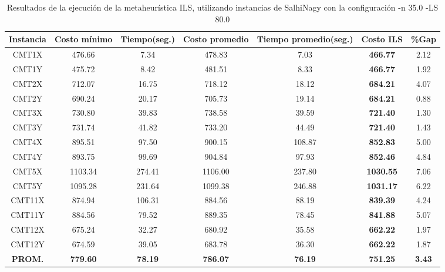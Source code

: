 \begin{table}[ht]
\caption{Resultados de la ejecución de la metaheurística ILS, utilizando instancias de SalhiNagy con la configuración -n 35.0 -LS 80.0}
\centering
\small
\begin{tabular}{c c c c c c c}
\hline\hline
Instancia & Costo mínimo & Tiempo(seg.) & Costo promedio & Tiempo promedio(seg.) & Costo ILS & \%Gap \\ [0.5ex]
\hline
CMT1X & 476.66 & 7.34 & 
478.83 & 7.03 & \bf{466.77} & 
2.12\\CMT1Y & 475.72 & 8.42 & 
481.51 & 8.33 & \bf{466.77} & 
1.92\\CMT2X & 712.07 & 16.75 & 
718.12 & 18.12 & \bf{684.21} & 
4.07\\CMT2Y & 690.24 & 20.17 & 
705.73 & 19.14 & \bf{684.21} & 
0.88\\CMT3X & 730.80 & 39.83 & 
738.58 & 39.59 & \bf{721.40} & 
1.30\\CMT3Y & 731.74 & 41.82 & 
733.20 & 44.49 & \bf{721.40} & 
1.43\\CMT4X & 895.51 & 97.50 & 
900.15 & 108.87 & \bf{852.83} & 
5.00\\CMT4Y & 893.75 & 99.69 & 
904.84 & 97.93 & \bf{852.46} & 
4.84\\CMT5X & 1103.34 & 274.41 & 
1106.00 & 237.80 & \bf{1030.55} & 
7.06\\CMT5Y & 1095.28 & 231.64 & 
1099.38 & 246.88 & \bf{1031.17} & 
6.22\\CMT11X & 874.94 & 106.31 & 
884.56 & 88.19 & \bf{839.39} & 
4.24\\CMT11Y & 884.56 & 79.52 & 
889.35 & 78.45 & \bf{841.88} & 
5.07\\CMT12X & 675.24 & 32.27 & 
680.92 & 35.58 & \bf{662.22} & 
1.97\\CMT12Y & 674.59 & 39.05 & 
683.78 & 36.30 & \bf{662.22} & 
1.87\\\bf{PROM.} & 
\bf{779.60} & \bf{78.19} & \bf{786.07} & \bf{76.19} & \bf{751.25} & \bf{3.43}\\[1ex]\hline
\end{tabular}
\label{table:nonlin}
\end{table} \clearpage
